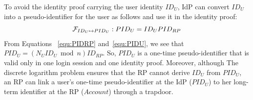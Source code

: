 \vspace{0.5mm}
To avoid the identity proof carrying the user identity $ID_U$, IdP can convert $ID_U$ into a pseudo-identifier for the user as follows and use it in the identity proof:
\begin{equation}
\setlength{\abovedisplayskip}{3pt}
\setlength{\belowdisplayskip}{3pt}
 \mathcal{F}_{ID_{U} \mapsto PID_{U}}: PID_U = {ID_U}{PID_{RP}}
 \label{equ:PIDU}
\end{equation}
From Equations%
~\ref{equ:PIDRP} and~\ref{equ:PIDU}, we see that $PID_U = ({N_UID_U} \bmod n){ID_{RP}}$. So, $PID_U$ is a one-time pseudo-identifier that is valid only in one login session and one identity proof.
Moreover, although The discrete logarithm problem ensures that the RP cannot derive $ID_U$ from $PID_U$, 
an RP can  link a user's one-time pseudo-identifier at the IdP ($PID_U$) to her long-term identifier at the RP ($Account$) through a trapdoor.



